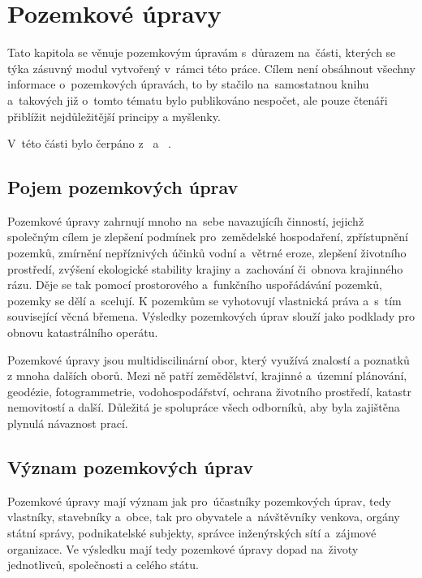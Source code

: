 \chapter{Pozemkové úpravy}
\label{2-pu}

Tato kapitola se věnuje pozemkovým úpravám s~důrazem na~části, kterých se týka zásuvný modul vytvořený v~rámci této práce. Cílem není obsáhnout všechny informace o~pozemkových úpravách, to by stačilo na~samostatnou knihu a~takových již o~tomto tématu bylo publikováno nespočet, ale pouze čtenáři přiblížit nejdůležitější principy a myšlenky.

V~této části bylo čerpáno z~\citep{pu_zakon} \citep{pu_skripta} \citep{pu_cr} a~ \citep{metodicky_navrh}.

\section{Pojem pozemkových úprav}
\label{pojem_pu}

Pozemkové úpravy zahrnují mnoho na~sebe navazujícíh činností, jejichž společným cílem je zlepšení podmínek pro~zemědelské hospodaření, zpřístupnění pozemků, zmírnění nepříznivých účinků vodní a~větrné eroze, zlepšení životního prostředí, zvýšení ekologické stability krajiny a~zachování či~obnova krajinného rázu. Děje se tak pomocí prostorového a~funkčního uspořádávání pozemků, pozemky se dělí a~scelují. K pozemkům se vyhotovují vlastnická práva a~s~tím související věcná břemena. Výsledky pozemkových úprav slouží jako podklady pro obnovu katastrálního operátu.

Pozemkové úpravy jsou multidiscilinární obor, který využívá znalostí a poznatků z mnoha dalších oborů. Mezi ně patří zemědělství, krajinné a~územní plánování, geodézie, fotogrammetrie, vodohospodářství, ochrana životního prostředí, katastr nemovitostí a další. Důležitá je spolupráce všech odborníků, aby byla zajištěna plynulá návaznost prací.

\section{Význam pozemkových úprav}
\label{vyznam_pu}

Pozemkové úpravy mají význam jak pro~účastníky pozemkových úprav, tedy vlastníky, stavebníky a~obce, tak pro obyvatele a~návštěvníky venkova, orgány státní správy, podnikatelské subjekty, správce inženýrských sítí a~zájmové organizace. Ve výsledku mají tedy pozemkové úpravy dopad na~životy jednotlivců, společnosti a celého státu.


